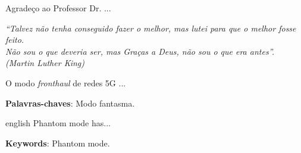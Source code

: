 \documentclass[
	12pt,				%
	openright,			%
	oneside,			%
	a4paper,			%
	english,			%
	brazil				%
	]{abntex2}
\begin{document}
\begin{agradecimentos}
Agradeço ao Professor Dr. ...
\end{agradecimentos}

\begin{epigrafe}
    \vspace*{\fill}
	\begin{flushright}
		\textit{``Talvez não tenha conseguido fazer o melhor, mas lutei para que o melhor fosse feito. \\ Não sou o que deveria ser, mas Graças a Deus, não sou o que era antes''. \\ (Martin Luther King)}
	\end{flushright}
\end{epigrafe}


\setlength{\absparsep}{18pt} %
\begin{resumo}
\hspace{1.5cm}O modo \textit{fronthaul} de redes 5G ...
	
 \textbf{Palavras-chaves}: Modo fantasma. 
\end{resumo}

\begin{resumo}[Abstract]
 \begin{otherlanguage*}{english}
\hspace{1.5cm}Phantom mode has...

   \vspace{\onelineskip}
 
   \noindent 
   \textbf{Keywords}: Phantom mode. 
 \end{otherlanguage*}
\end{resumo}


\listoffigures*
\cleardoublepage

\listoftables*
\cleardoublepage
\end{document}
